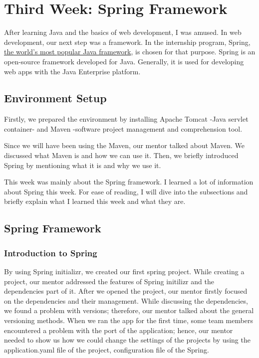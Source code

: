 \section{Third Week: Spring Framework}

After learning Java and the basics of web development, I was amused. In web development, our next step was a framework. In the internship program, Spring, \href{https://spring.io/why-spring}{the world's most popular Java framework}, is chosen for that purpose. Spring is an open-source framework developed for Java. Generally, it is used for developing web apps with the Java Enterprise platform.

\subsection{Environment Setup}

Firstly, we prepared the environment by installing Apache Tomcat -Java servlet container- and Maven -software project management and comprehension tool. 

Since we will have been using the Maven, our mentor talked about Maven. We discussed what Maven is and how we can use it. Then, we briefly introduced Spring by mentioning what it is and why we use it.

This week was mainly about the Spring framework. I learned a lot of information about Spring this week. For ease of reading, I will dive into the subsections and briefly explain what I learned this week and what they are.

\subsection{Spring Framework}

\subsubsection{Introduction to Spring}

By using Spring initializr, we created our first spring project. While creating a project, our mentor addressed the features of Spring initilizr and the dependencies part of it. After we opened the project, our mentor firstly focused on the dependencies and their management. While discussing the dependencies, we found a problem with versions; therefore, our mentor talked about the general versioning methods. When we ran the app for the first time, some team members encountered a problem with the port of the application; hence, our mentor needed to show us how we could change the settings of the projects by using the application.yaml file of the project, configuration file of the Spring.

